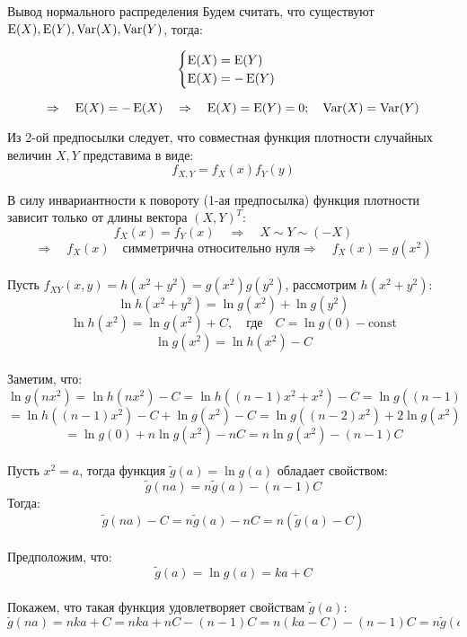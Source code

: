 \begin{frame}[t]
\begin{columns}[t]
\begin{column}{.465\textwidth}
\begin{block}{\large{Вывод нормального распределения}}
Будем считать, что существуют $\operatorname{E}(X), \operatorname{E}(Y), \operatorname{Var}(X), \operatorname{Var}(Y)$, тогда:\\
\begin{minipage}{.3\textwidth}
	
		\[
		\begin{cases}
		\operatorname{E}(X)=\operatorname{E}(Y)\\
		\operatorname{E}(X)=-\operatorname{E}(Y)
		\end{cases}
		\]
		
\end{minipage}
\begin{minipage}{.7\textwidth}
	\[
	\Rightarrow \quad \operatorname{E}(X)=-\operatorname{E}(X) \quad \Rightarrow \quad \operatorname{E}(X)=\operatorname{E}(Y)=0; \quad \operatorname{Var}(X)=\operatorname{Var}(Y)
	\]
\end{minipage}

\vspace{0.1 in} 
\vspace{15mm}
Из 2-ой предпосылки следует, что совместная функция плотности случайных величин $X, Y$ представима в виде:
\[f_{X,Y}=f_X(x)f_Y(y)\]
\vspace{5mm}

В силу инвариантности к повороту (1-ая предпосылка) функция плотности зависит только от длины вектора $(X, Y)^T$:
\[f_X(x)=f_Y(x) \quad \Rightarrow \quad X \sim Y \sim (-X)  \]
\[\Rightarrow \quad f_X(x) \quad \text{симметрична относительно нуля} \Rightarrow \quad f_X(x)=g(x^2) \]
\vspace{0.05 in} 
\\
Пусть $f_{XY}(x,y)=h(x^2+y^2)=g(x^2)g(y^2)$, рассмотрим $h(x^2+y^2)$:
\[ \ln h(x^2+y^2)= \ln g(x^2)+\ln g(y^2)\]
\[\ln h(x^2) = \ln g(x^2) + C, \quad \text{где} \quad C=\ln g(0)-\text{const} \]
\[ \ln g(x^2) = \ln h(x^2) - C\]
\vspace{0.05 in} 
\\
Заметим, что:
\[ \ln g(nx^2) = \ln h(nx^2) - C= \ln h ((n-1)x^2+x^2) - C = \ln g ((n-1)x^2)+  \ln g(x^2) - C =\]
\[= \ln h((n-1)x^2) - C + \ln g(x^2) - C = \ln g((n-2)x^2) + 2\ln g(x^2) - 2C = ...=\]
\[=\ln g(0) + n\ln g(x^2)-nC=n\ln g(x^2)-(n-1)C\]
\vspace{0.05 in} 
\\
Пусть $x^2=a$, тогда функция $\tilde{g}(a)=\ln g(a)$ обладает свойством:
\[\tilde{g}(na)=n\tilde{g}(a)-(n-1)C\]
Тогда:
\[\tilde{g}(na)-C=n\tilde{g}(a)-nC=n(\tilde{g}(a)-C)\]
\vspace{0.05 in} 
\\
Предположим, что:
\[\tilde{g}(a)=\ln g(a) =ka + C\]
\vspace{0.05 in} 
\\
Покажем, что такая функция удовлетворяет свойствам $\tilde{g}(a)$:
\[\tilde{g}(na)=nka+C=nka+nC-(n-1)C=n(ka-C)-(n-1)C=n\tilde{g}(a)-(n-1)C\]
\vspace{0.05 in} 
\\


\end{block}
\end{column}
\end{columns}
\end{frame}
